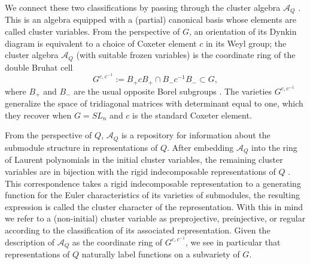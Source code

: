 \documentclass[12pt]{amsart}
\newcommand{\cA}{\mathcal{A}}
\newcommand{\CC}{\mathbb{C}}
\theoremstyle{remark}
\numberwithin{equation}{section}
\numberwithin{figure}{section}
\begin{document}

We connect these two classifications by passing through the cluster algebra $\cA_Q$ \cite{FZ02}. 
This is an algebra equipped with a (partial) canonical basis whose elements are called cluster variables. 
From the perspective of $G$, an orientation of its Dynkin diagram is equivalent to a choice of Coxeter element $c$ in its Weyl group; the cluster algebra $\cA_Q$ (with suitable frozen variables) is the coordinate ring of the double Bruhat cell  $$G^{c,c^{-1}} := B_+ c B_+ \cap B_- c^{-1} B_- \subset G,$$
where $B_+$ and $B_-$ are the usual opposite Borel subgroups \cite{BFZ05,Wil13}. 
The varieties $G^{c,c^{-1}}$ generalize the space of tridiagonal matrices with determinant equal to one, which they recover when $G=SL_n$ and $c$ is the standard Coxeter element.

From the perspective of $Q$, $\cA_Q$ is a repository for information about the submodule structure in representations of $Q$. 
After embedding $\cA_Q$ into the ring of Laurent polynomials in the initial cluster variables, the remaining cluster variables are in bijection with the rigid indecomposable representations of $Q$ \cite{CC,CK}. 
This correspondence takes a rigid indecomposable representation to a generating function for the Euler characteristics of its varieties of submodules, the resulting expression is called the cluster character of the representation.
With this in mind we refer to a (non-initial) cluster variable as preprojective, preinjective, or regular according to the classification of its associated representation. 
Given the description of $\cA_Q$ as the coordinate ring of $G^{c,c^{-1}}$, we see in particular that representations of $Q$ naturally label functions on a subvariety of $G$.
\end{document}
